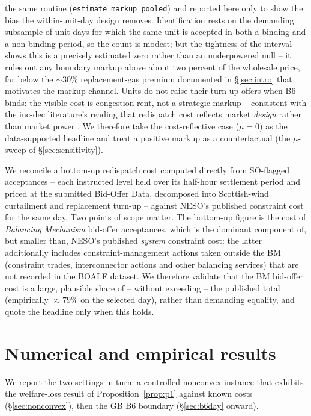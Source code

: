 \documentclass[review,3p,times]{elsarticle}
\theoremstyle{plain}
\theoremstyle{definition}
\begin{document}
the same routine (\texttt{estimate\_markup\_pooled}) and reported here only to show
the bias the within-unit-day design removes.
Identification rests on the demanding subsample of unit-days for which the same
unit is accepted in both a binding and a non-binding period, so the count is
modest; but the tightness of the interval shows this is a precisely estimated zero
rather than an underpowered null -- it rules out any boundary markup above about
two percent of the wholesale price, far below the $\sim$30\% replacement-gas
premium documented in \S\ref{sec:intro} that motivates the markup channel.
Units do not raise their turn-up offers when B6 binds: the visible cost is
congestion rent, not a strategic markup -- consistent with the inc-dec literature's
reading that redispatch cost reflects market \emph{design} rather than market
power \citep{hirthschlecht2019}. We therefore take the cost-reflective case
($\mu=0$) as the data-supported headline and treat a positive markup as a
counterfactual (the $\mu$-sweep of \S\ref{sec:sensitivity}).

We reconcile a bottom-up redispatch cost computed directly from SO-flagged
acceptances -- each instructed level held over its half-hour settlement period and
priced at the submitted Bid-Offer Data, decomposed into Scottish-wind curtailment
and replacement turn-up -- against NESO's published constraint cost for the same
day. Two points of scope matter. The bottom-up figure is the cost of
\emph{Balancing Mechanism} bid-offer acceptances, which is the dominant component
of, but smaller than, NESO's published \emph{system} constraint cost: the latter
additionally includes constraint-management actions taken outside the BM
(constraint trades, interconnector actions and other balancing services) that
are not recorded in the BOALF dataset. We therefore validate that the BM
bid-offer cost is a large, plausible share of -- without exceeding -- the published
total (empirically $\approx 79\%$ on the selected day), rather than demanding
equality, and quote the headline only when this holds.

\section{Numerical and empirical results}
\label{sec:results}

We report the two settings in turn: a controlled nonconvex instance that exhibits
the welfare-loss result of Proposition~\ref{prop:p1} against known costs
(\S\ref{sec:nonconvex}), then the GB B6 boundary (\S\ref{sec:b6day} onward).
\end{document}
